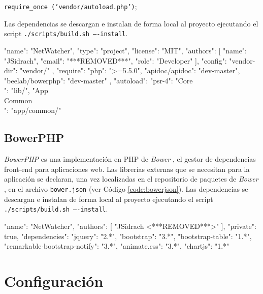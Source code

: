 \texttt{require\_once ('vendor/autoload.php')};

Las dependencias se descargan e instalan de forma local al proyecto ejecutando el \gls{script} \texttt{./scripts/build.sh ----install}.

\begin{code}[label=code:composerjson,language=json,caption=Ejemplo de fichero \textit{composer.json}]
{
  "name": "NetWatcher",
  "type": "project",
  "license": "MIT",
  "authors": [
    {
      "name": "JSidrach",
      "email": "***REMOVED***",
      "role": "Developer"
    }
  ],
  "config": {
    "vendor-dir": "vendor/"
   },
  "require": {
    "php": ">=5.5.0",
    "apidoc/apidoc": "dev-master",
    "beelab/bowerphp": "dev-master"
  },
  "autoload": {
    "psr-4": {
      "Core\\": "lib/",
      "App\\Common\\": "app/common/"
    }
  }
}
\end{code}

\subsection*{BowerPHP\label{extra:mvc:bowerphp}}

\textit{BowerPHP} es una implementación en \gls{PHP} de \textit{Bower} \cite{bower}, el gestor de dependencias \gls{front-end} para aplicaciones web. Las librerías externas que se necesitan para la aplicación se declaran, una vez localizadas en el repositorio de paquetes de \textit{Bower} \cite{bowerrepositorio}, en el archivo \texttt{bower.json} (ver Código \ref{code:bowerjson}). Las dependencias se descargan e instalan de forma local al proyecto ejecutando el \gls{script} \texttt{./scripts/build.sh ----install}.

\begin{code}[label=code:bowerjson,language=json,caption=Ejemplo de fichero \textit{bower.json}]
{
  "name": "NetWatcher",
  "authors": [
    "JSidrach <***REMOVED***>"
  ],
  "private": true,
  "dependencies": {
    "jquery": "2.*",
    "bootstrap": "3.*",
    "bootstrap-table": "1.*",
    "remarkable-bootstrap-notify": "3.*",
    "animate.css": "3.*",
    "chartjs": "1.*"
  }
}
\end{code}

\section{Configuración\label{extra:mvc:config}}

